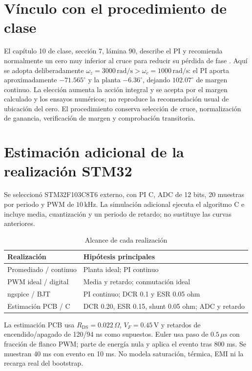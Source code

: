 \documentclass[conference,letterpaper]{IEEEtran}
\begin{document}
\section{Vínculo con el procedimiento de clase}
El capítulo 10 de clase, sección 7, lámina 90, describe el PI y recomienda normalmente un cero muy inferior al cruce para reducir su pérdida de fase \cite{frequency}. Aquí se adopta deliberadamente $\omega_z=3000\,\mathrm{rad/s}>\omega_c=1000\,\mathrm{rad/s}$: el PI aporta aproximadamente $-71.565^\circ$ y la planta $-6.36^\circ$, dejando $102.07^\circ$ de margen continuo. La elección aumenta la acción integral y se acepta por el margen calculado y los ensayos numéricos; no reproduce la recomendación usual de ubicación del cero. El procedimiento conserva selección de cruce, normalización de ganancia, verificación de margen y comprobación transitoria.

\section{Estimación adicional de la realización STM32}
Se seleccionó STM32F103C8T6 externo, con PI C, ADC de 12 bits, 20 muestras por periodo y PWM de $10\,\mathrm{kHz}$. La simulación adicional ejecuta el algoritmo C e incluye media, cuantización y un periodo de retardo; no sustituye las curvas anteriores.

\begin{table}[H]\caption{Alcance de cada realización}\label{tab:model-scope}\centering\footnotesize\setlength{\tabcolsep}{2pt}\renewcommand{\arraystretch}{1.18}\begin{tabularx}{\columnwidth}{LY}\toprule
Realización & Hipótesis principales\\\midrule
Promediado / continuo & Planta ideal; PI continuo\\
PWM ideal / digital & Media y retardo; conmutación ideal\\
ngspice / BJT & PI continuo; DCR 0.1 y ESR 0.05 ohm\\
Estimación PCB / C & DCR 0.20, ESR 0.15, shunt 0.05 ohm; ADC y retardo\\\bottomrule\end{tabularx}\end{table}
La estimación PCB usa $R_{\mathrm{DS}}=0.022\,\Omega$, $V_F=0.45\,\mathrm{V}$ y retardos de encendido/apagado de 120/94 ns como supuestos. Euler usa paso de $0.5\,\mu\mathrm{s}$ con fracción de flanco PWM; parte de energía nula y aplica el evento tras 800 ms. Se muestran 40 ms con evento en 10 ms. No modela saturación, térmica, EMI ni la recarga real del bootstrap.
\end{document}
